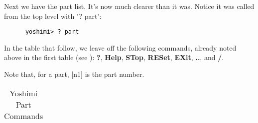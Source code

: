    Next we have the part list. It's now much clearer than it was.
   Notice it was called from the top level with '? part':

   \begin{verbatim}
      yoshimi> ? part
   \end{verbatim}

   In the table that follow, we leave off the following commands, already noted
   above in the first table
   (see ):
   \textbf{?}, \textbf{Help}, \textbf{STop}, \textbf{RESet},
   \textbf{EXit}, \textbf{..}, and \textbf{/}.

   Note that, for a part, [n1] is the part number.

   \begin{table}[H]
      \centering
      \caption{Yoshimi Part Commands}
      \label{table:yoshimi_text_part_commands}
      \begin{tabular}{l l}


\end{tabular}
\end{table}
